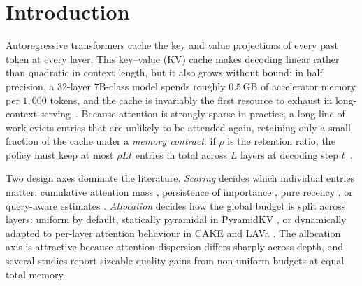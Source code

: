 \section{Introduction}\label{sec:intro}

Autoregressive transformers cache the key and value projections of every
past token at every layer. This key--value (KV) cache makes decoding
linear rather than quadratic in context length, but it also grows without
bound: in half precision, a 32-layer 7B-class model spends roughly
$0.5$\,GB of accelerator memory per $1{,}000$ tokens, and the cache is
invariably the first resource to exhaust in long-context
serving~\cite{pope2023efficiently,kwon2023paged}. Because attention is
strongly sparse in practice, a long line of work evicts entries that are
unlikely to be attended again, retaining only a small fraction of the
cache under a \emph{memory contract}: if $\rho$ is the retention ratio,
the policy must keep at most $\rho L t$ entries in total across $L$ layers
at decoding step $t$~\cite{zhang2023h2o,liu2023scissorhands,%
xiao2024streamingllm,oren2024tova}.

Two design axes dominate the literature. \emph{Scoring} decides which
individual entries matter: cumulative attention mass
\cite{zhang2023h2o}, persistence of importance \cite{liu2023scissorhands},
pure recency \cite{xiao2024streamingllm}, or query-aware estimates
\cite{tang2024quest,li2024snapkv}. \emph{Allocation} decides how the
global budget is split across layers: uniform by default,
statically pyramidal in PyramidKV \cite{cai2024pyramidkv}, or dynamically
adapted to per-layer attention behaviour in CAKE \cite{qin2025cake} and
LAVa \cite{shen2025lava}. The allocation axis is attractive because
attention dispersion differs sharply across depth, and several studies
report sizeable quality gains from non-uniform budgets at equal total
memory.

